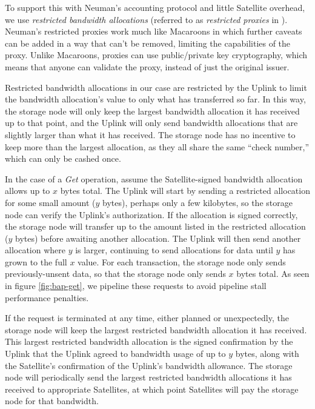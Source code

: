 \documentclass[8pt,fleqn,openany]{book}
\begin{document}
To support this with Neuman's accounting protocol and little Satellite overhead,
we use {\em restricted bandwidth allocations}
(referred to as {\em restricted proxies} in \cite{proxy-accounting}).
Neuman's restricted proxies work much like Macaroons
\cite{macaroons} in which further caveats can be added in a way that can't be
removed, limiting the capabilities of the proxy. Unlike Macaroons, proxies
can use public/private key cryptography, which means that anyone can validate
the proxy, instead of just the original issuer.

Restricted bandwidth allocations in our case are restricted by the Uplink to
limit the bandwidth allocation's value to only what has transferred so far.
In this way, the storage node will only keep the largest bandwidth allocation
it has received up to that point, and the Uplink will only send bandwidth allocations
that are slightly larger than what it has received.
The storage node has no incentive to keep more than the largest allocation, as
they all share the same ``check number,'' which can only be cashed once.

In the case of a {\em Get} operation, assume the Satellite-signed bandwidth
allocation allows up to $x$ bytes total. The Uplink
will start by sending a restricted allocation for some small amount ($y$ bytes),
perhaps only a few kilobytes,
so the storage node can verify the Uplink's authorization.
If the allocation is signed correctly, the storage node will
transfer up to the amount listed in the restricted allocation ($y$ bytes) before
awaiting another allocation. The Uplink will then send another allocation where
$y$ is larger, continuing to send allocations for data until $y$ has grown to
the full $x$ value.
For each transaction, the storage node only sends previously-unsent data,
so that the storage node only sends $x$ bytes total.
As seen in figure \ref{fig:bap-get},
we pipeline these requests to avoid pipeline stall performance penalties.

If the request is terminated at any time,
either planned or unexpectedly,
the storage node will keep the largest restricted bandwidth allocation it has
received.
This largest restricted bandwidth allocation is the signed confirmation
by the Uplink that the Uplink agreed to bandwidth usage of up to $y$
bytes, along with the Satellite's confirmation of the Uplink's bandwidth
allowance.
The storage node will periodically send the largest restricted bandwidth
allocations it has received to appropriate Satellites, at which point
Satellites will pay the storage node for that bandwidth.
\end{document}

